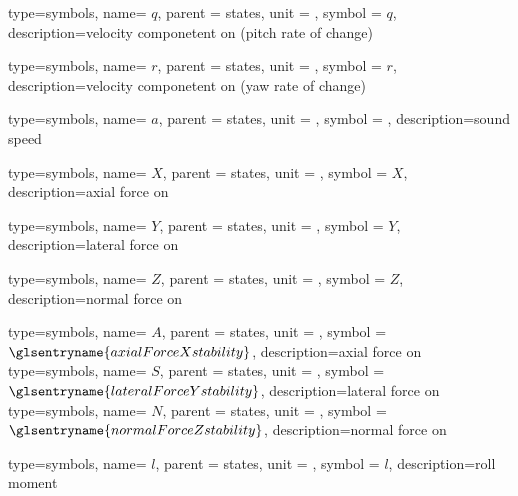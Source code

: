 {type=symbols,
  name= \ensuremath{q},
  parent = {states},
  unit = \unexpanded{\si{\radian\per\second}},
  symbol = \ensuremath{q},
  description={velocity componetent on  (pitch rate of change)}
}

{type=symbols,
  name= \ensuremath{r},
  parent = {states},
  unit = \unexpanded{\si{\radian\per\second}},
  symbol = \ensuremath{r},
  description={velocity componetent on  (yaw rate of change)}
}

{type=symbols,
  name= \ensuremath{a},
  parent = {states},
  unit = \unexpanded{\si{\meter\per\second}},
  symbol = ,
  description={sound speed}
}

{type=symbols,
  name= \ensuremath{X},
  parent = {states},
  unit = \unexpanded{\si{\newton}},
  symbol = \ensuremath{X},
  description={axial force on }
}

{type=symbols,
  name= \ensuremath{Y},
  parent = {states},
  unit = \unexpanded{\si{\newton}},
  symbol = \ensuremath{Y},
  description={lateral force on }
}

{type=symbols,
  name= \ensuremath{Z},
  parent = {states},
  unit = \unexpanded{\si{\newton}},
  symbol = \ensuremath{Z},
  description={normal force on }
}

{type=symbols,
  name= \ensuremath{A},
  parent = {states},
  unit = \unexpanded{\si{\newton}},
  symbol = \ensuremath{\glsentryname{axialForceXstability}},
  description={axial force on }
}
{type=symbols,
  name= \ensuremath{S},
  parent = {states},
  unit = \unexpanded{\si{\newton}},
  symbol = \ensuremath{\glsentryname{lateralForceYstability}},
  description={lateral force on }
}
{type=symbols,
  name= \ensuremath{N},
  parent = {states},
  unit = \unexpanded{\si{\newton}},
  symbol = \ensuremath{\glsentryname{normalForceZstability}},
  description={normal force on }
}


{type=symbols,
  name= \ensuremath{l},
  parent = {states},
  unit = \unexpanded{\si{\newton\meter}},
  symbol = \ensuremath{l},
  description={roll moment}
}

